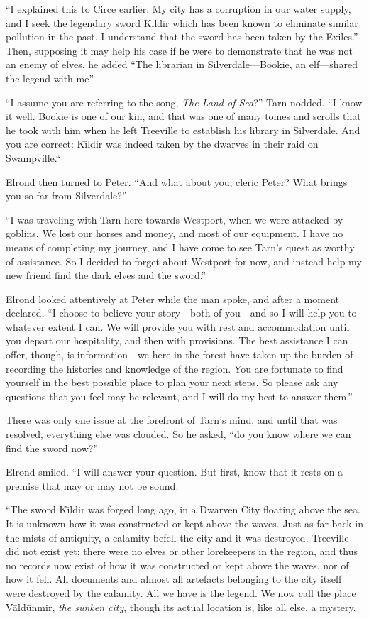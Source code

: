 ``I explained this to Circe earlier.  My city has a corruption in our water supply, and I seek the legendary sword K\=\i{}ldir which has been known to eliminate similar pollution in the past.  I understand that the sword has been taken by the Exiles.'' Then, supposing it may help his case if he were to demonstrate that he was not an enemy of elves, he added ``The librarian in Silverdale---Bookie, an elf---shared the legend with me''

``I assume you are referring to the song, \emph{The Land of Sea}?''
Tarn nodded.
``I know it well.  Bookie is one of our kin, and that was one of many tomes and scrolls that he took with him when he left Treeville to establish his library in Silverdale.  And you are correct: K\=\i{}ldir was indeed taken by the dwarves in their raid on Swampville.``

Elrond then turned to Peter.  ``And what about you, cleric Peter?  What brings you so far from Silverdale?''

``I was traveling with Tarn here towards Westport, when we were attacked by goblins.  We lost our horses and money, and most of our equipment.  I have no means of completing my journey, and I have come to see Tarn's quest as worthy of assistance.  So I decided to forget about Westport for now, and instead help my new friend find the dark elves and the sword.''

Elrond looked attentively at Peter while the man spoke, and after a moment declared, ``I choose to believe your story---both of you---and so I will help you to whatever extent I can.  We will provide you with rest and accommodation until you depart our hospitality, and then with provisions.  The best assistance I can offer, though, is information---we here in the forest have taken up the burden of recording the histories and knowledge of the region.  You are fortunate to find yourself in the best possible place to plan your next steps.  So please ask any questions that you feel may be relevant, and I will do my best to answer them.''

There was only one issue at the forefront of Tarn's mind, and until that was resolved, everything else was clouded.  So he asked, ``do you know where we can find the sword now?''

Elrond smiled.  ``I will answer your question.  But first, know that it rests on a premise that may or may not be sound.

``The sword K\=\i{}ldir was forged long ago, in a Dwarven City floating above the sea.  It is unknown how it was constructed or kept above the waves.  Just as far back in the mists of antiquity, a calamity befell the city and it was destroyed.  Treeville did not exist yet; there were no elves or other lorekeepers in the region, and thus no records now exist of how it was constructed or kept above the waves, nor of how it fell.  All documents and almost all artefacts belonging to the city itself were destroyed by the calamity.  All we have is the legend.  We now call the place V\=ald\=unmir, \emph{the sunken city}, though its actual location is, like all else, a mystery.

